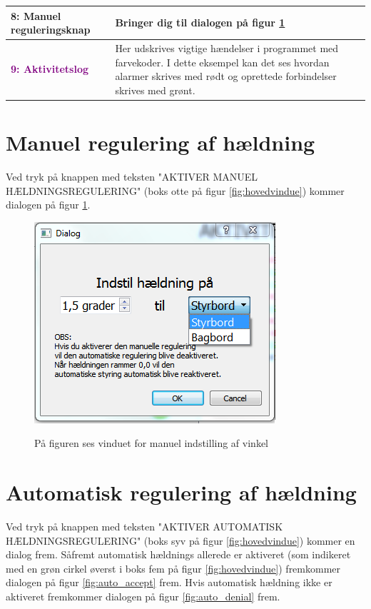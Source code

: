 \begin{table}[H]
\begin{center}
\begin{tabular}{| l | p{9.5cm} | }
\textcolor{BlueGreen}{\textbf{8: Manuel reguleringsknap}}
&Bringer dig til dialogen på figur \ref{fig:manuelvindue}\\\hline

\textcolor{purple}{\textbf{9: Aktivitetslog}}
&Her udskrives vigtige hændelser i programmet med farvekoder. I dette eksempel kan det ses hvordan alarmer skrives med rødt og oprettede forbindelser skrives med grønt.\\\hline

\end{tabular}
\end{center}
\end{table}


\section*{Manuel regulering af hældning}
Ved tryk på knappen med teksten "AKTIVER MANUEL HÆLDNINGSREGULERING" (boks otte på figur \ref{fig:hovedvindue}) kommer dialogen på figur \ref{fig:manuelvindue}.
\begin{figure}[H]
\centering
\includegraphics[scale=1]{billeder/GUI/manuelvindue}
\label{fig:manuelvindue}
\caption{På figuren ses vinduet for manuel indstilling af vinkel}
\end{figure}

\section*{Automatisk regulering af hældning}
Ved tryk på knappen med teksten "AKTIVER AUTOMATISK HÆLDNINGSREGULERING" (boks syv på figur \ref{fig:hovedvindue}) kommer en dialog frem. Såfremt automatisk hældnings allerede er aktiveret (som indikeret med en grøn cirkel øverst i boks fem på figur \ref{fig:hovedvindue}) fremkommer dialogen på figur \ref{fig:auto_accept} frem.
Hvis automatisk hældning ikke er aktiveret fremkommer dialogen på figur \ref{fig:auto_denial} frem.

